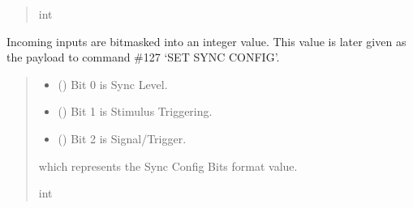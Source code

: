 \documentclass[letterpaper,10pt,english]{sphinxmanual}
\begin{document}
\begin{fulllineitems}
\begin{fulllineitems}
\begin{quote}
\begin{description}
\sphinxAtStartPar
int

\end{description}\end{quote}

\end{fulllineitems}


\begin{fulllineitems}
\label{\detokenize{PodDevice_8480SC:PodDevice_8480SC.POD_8480SC.SyncConfigBits}}
\pysigstartsignatures
{}
\pysigstopsignatures
\sphinxAtStartPar
Incoming inputs are bitmasked into an integer value. This value is later given         as the payload to command \#127 ‘SET SYNC CONFIG’.
\begin{quote}\begin{description}
\begin{itemize}
\item {} 
\sphinxAtStartPar
{} () \textendash{} Bit 0 is Sync Level.

\item {} 
\sphinxAtStartPar
{} () \textendash{} Bit 1 is Stimulus Triggering.

\item {} 
\sphinxAtStartPar
{} () \textendash{} Bit 2 is Signal/Trigger.

\end{itemize}

\sphinxAtStartPar
which represents the Sync Config Bits format value.

\sphinxAtStartPar
int

\end{description}\end{quote}


\end{fulllineitems}
\end{fulllineitems}
\end{document}
